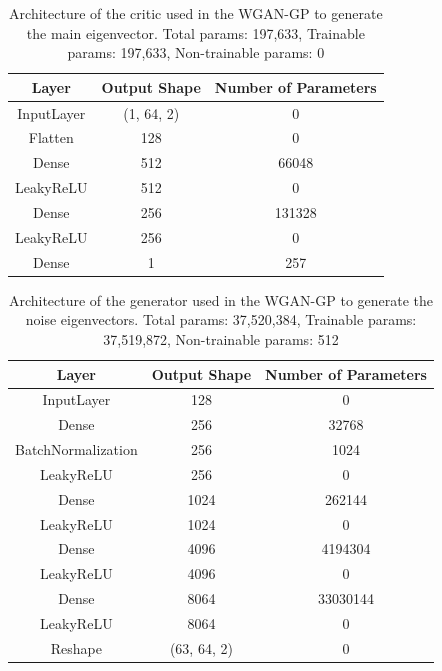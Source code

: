 \documentclass[11pt,a4paper,twoside]{report}
\begin{document}
\begin{table}[]
  \centering
  \begin{tabular}{c c c}
      \hline
      \textbf{Layer} & \textbf{Output Shape} & \textbf{Number of Parameters} \\ \hline
      InputLayer            & (1, 64, 2)    & 0                 \\
      Flatten               & 128           & 0                 \\
      Dense                 & 512           & 66048             \\
      LeakyReLU             & 512           & 0                 \\
      Dense                 & 256           & 131328            \\
      LeakyReLU             & 256           & 0                 \\
      Dense                 & 1             & 257               \\
  \end{tabular}
  \caption{Architecture of the critic used in the WGAN-GP to generate the main eigenvector. Total params: 197,633, Trainable params: 197,633, Non-trainable params: 0}
  \label{tab:main_evec_critic_WGANGP_architecture}
\end{table}

\begin{table}[]
  \centering
  \begin{tabular}{c c c}
      \hline
      \textbf{Layer} & \textbf{Output Shape} & \textbf{Number of Parameters} \\ \hline
      InputLayer            & 128           & 0                 \\
      Dense                 & 256           & 32768             \\
      BatchNormalization    & 256           & 1024              \\
      LeakyReLU             & 256           & 0                 \\
      Dense                 & 1024          & 262144            \\
      LeakyReLU             & 1024          & 0                 \\
      Dense                 & 4096          & 4194304           \\
      LeakyReLU             & 4096          & 0                 \\
      Dense                 & 8064          & 33030144          \\
      LeakyReLU             & 8064          & 0                 \\
      Reshape               & (63, 64, 2)   & 0                 \\
  \end{tabular}
  \caption{Architecture of the generator used in the WGAN-GP to generate the noise eigenvectors. Total params: 37,520,384, Trainable params: 37,519,872, Non-trainable params: 512}
  \label{tab:noise_evecs_generator_WGANGP_architecture}
\end{table}
\end{document}
